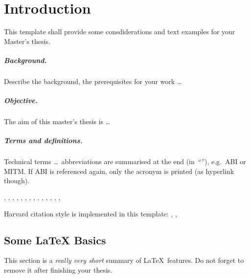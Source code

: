 \chapter{Introduction}\label{chap:introduction}
\chapterstart

This template shall provide some consdiderations and text examples for your Master's thesis.

\paragraph{Background.}
Describe the background, the prerequisites for your work \ldots


\paragraph{Objective.}
The aim of this master's thesis is \ldots


\paragraph{Terms and definitions.}
Technical terms \ldots\ abbreviations are summarised at the end (in~``''), e.g.\ \ac{ABI} or \ac{MITM}. If \ac{ABI} is referenced again, only the acronym is printed (as hyperlink though).


\citet{Corre:2017:WHI},  \parencite{Corre:2017:WHI}
\citet{Boyed:2012:GSOA},
\citet{Lynch:2017:IIG},
\citet{Todorov:2007:MUI},
\citet{Prochazka:2010:UCA},
\citet{Tomkins:2009:DPF},
\citet{Corre:2017:WHI},
\citet{Neumann:2018:PTC},
\citet{OpenID:2018:ACDG},
\citet{Basheer:2011:ACWG},
\citet{NIST:2017:DIG},
\citet{Brooks:2017:IPE},
\citet{Dingle:2015:OAC},
\citet{Fangyuan:2015:SPCSSO},
\citet{Dasgupta:2017:AUA}

Harvard citation style is implemented in this template: \citet{Batina:2011:HER:2188496.2188508}, \citet{Fernandez-Mir:2011:SRA:2188496.2188506}, \citet{Li:2008:TRP:2043628.2043631}


\section{Some \LaTeX{} Basics}
This section is a \textit{really very short} summary of \LaTeX\ features. Do not forget to remove it after finishing your thesis.

